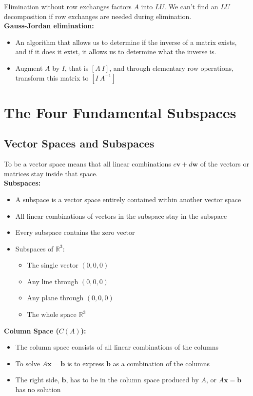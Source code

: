 \documentclass[11pt]{article}
\begin{document}
Elimination without row exchanges factors $A$ into $LU$. We can't find an $LU$ decomposition if 
row exchanges are needed during elimination. \\

\textbf{Gauss-Jordan elimination:}
\begin{itemize}
    \item An algorithm that allows us to determine if the inverse of a matrix exists, and if it
    does it exist, it allows us to determine what the inverse is. 
    \item Augment $A$ by $I$, that is $ \left[ A \ I \right]$, and through elementary row 
    operations, transform this matrix to $ \left[ I \ A^{-1} \right]$
\end{itemize}

\section{The Four Fundamental Subspaces}
\subsection{Vector Spaces and Subspaces}

To be a vector space means that all linear combinations $c\boldsymbol{v} + d\boldsymbol{w}$ of 
the vectors or matrices stay inside that space. \\

\textbf{Subspaces:} 
\begin{itemize}
    \item A subspace is a vector space entirely contained within another vector space
    \item All linear combinations of vectors in the subspace stay in the subspace
    \item Every subspace contains the zero vector
    \item Subspaces of $\mathbb{R}^3$:
    \begin{itemize}
        \item The single vector $(0,0,0)$
        \item Any line through $(0,0,0)$
        \item Any plane through $(0,0,0)$
        \item The whole space $\mathbb{R}^3$
    \end{itemize}
\end{itemize} 

\textbf{Column Space ($C(A)$):}
\begin{itemize}
    \item The column space consists of all linear combinations of the columns
    \item To solve $A\boldsymbol{x} = \boldsymbol{b}$ is to express $\boldsymbol{b}$ as a
    combination of the columns
    \item The right side, $\boldsymbol{b}$, has to be in the column space produced by $A$, or 
    $A\boldsymbol{x} = \boldsymbol{b}$ has no solution
\end{itemize}
\end{document}
